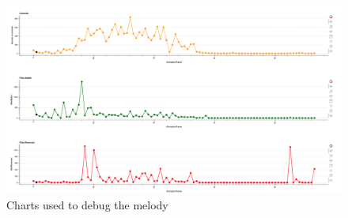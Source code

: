 \begin{landscape}
    \Huge 
\begin{figure}
    \center
    \includegraphics[width=\textwidth]{Bokeh.png}
    \caption{Charts used to debug the melody}
    \label{fig:Bokeh}
\end{figure}
\end{landscape}



